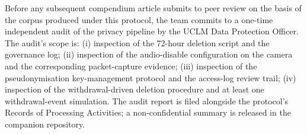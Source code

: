 Before any subsequent compendium article submits to peer review on the basis of the corpus produced under this protocol, the team commits to a one-time independent audit of the privacy pipeline by the UCLM Data Protection Officer. The audit's scope is: (i) inspection of the 72-hour deletion script and the governance log; (ii) inspection of the audio-disable configuration on the camera and the corresponding packet-capture evidence; (iii) inspection of the pseudonymisation key-management protocol and the access-log review trail; (iv) inspection of the withdrawal-driven deletion procedure and at least one withdrawal-event simulation. The audit report is filed alongside the protocol's Records of Processing Activities; a non-confidential summary is released in the companion repository.
